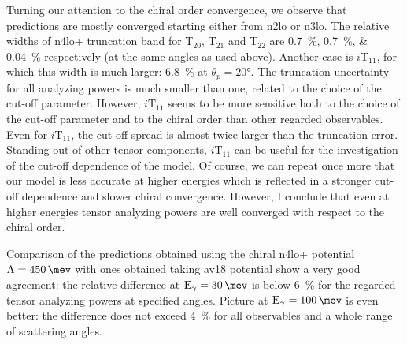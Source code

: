     Turning our attention to the chiral order convergence, we
    observe that predictions are mostly converged starting either from \gls{n2lo} or \gls{n3lo}.
    The relative widths of \gls{n4lo+} truncation band 
    for T$_{20}$, T$_{21}$ and T$_{22}$
    are \SIlist{0.7; 0.7; 0.04}{\percent} respectively (at the same angles as used above).
    Another case is $i\text{T}_{11}$, for which this width is much larger: \SI{6.8}{\percent} at $\theta_p = \ang{20}$.
    The truncation uncertainty for all analyzing powers is much smaller than one,
    related to the choice of the cut-off parameter.
    However, $i\text{T}_{11}$ seems to be more sensitive both
    to the choice of the cut-off parameter and to the chiral order than other regarded observables.
    Even for $i\text{T}_{11}$, the cut-off spread is almost twice larger than the truncation error.
    Standing out of other tensor components, $i\text{T}_{11}$ can be useful for the investigation of 
    the cut-off dependence of the model.
    Of course, we can repeat once more that 
    our model is less accurate at higher energies which is reflected
    in a stronger cut-off dependence and slower chiral convergence.
    However, I conclude that even at higher energies tensor analyzing powers are
    well converged with respect to the chiral order.

    Comparison of the predictions obtained using the chiral \gls{n4lo+} potential
    $\Lambda = \SI{450}{\mev}$ with ones obtained taking \gls{av18} potential
    show a very good agreement: the relative difference at $\text{E}_\gamma=\SI{30}{\mev}$
    is below \SI{6}{\percent} for the regarded tensor analyzing powers at specified angles.
    Picture at  $\text{E}_\gamma=\SI{100}{\mev}$ is even better: the difference does not exceed 
    \SI{4}{\percent} for all observables and a whole range of scattering angles.


